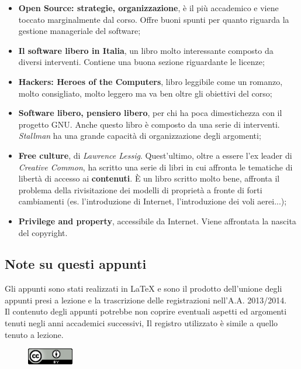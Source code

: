\begin{itemize}

\item \textbf{Open Source: strategie, organizzazione}, è il più accademico e viene toccato marginalmente dal corso. Offre buoni spunti per quanto riguarda la gestione manageriale del software;
\item \textbf{Il software libero in Italia}, un libro molto interessante composto da diversi interventi. Contiene una buona sezione riguardante le licenze;
\item \textbf{Hackers: Heroes of the Computers}, libro leggibile come un romanzo, molto consigliato, molto leggero ma va ben oltre gli obiettivi del corso;
\item \textbf{Software libero, pensiero libero}, per chi ha poca dimestichezza con il progetto GNU. Anche questo libro è composto da una serie di interventi. \textit{Stallman} ha una grande capacità di organizzazione degli argomenti;
\item \textbf{Free culture}, di \textit{Lawrence Lessig}. Quest'ultimo, oltre a essere l'ex leader di \textit{Creative Common}, ha scritto una serie di libri in cui affronta le tematiche di libertà di accesso ai \textbf{contenuti}. È un libro scritto molto bene, affronta il problema della rivisitazione dei modelli di proprietà a fronte di forti cambiamenti (es. l'introduzione di Internet, l'introduzione dei voli aerei...);
\item \textbf{Privilege and property}, accessibile da Internet. Viene affrontata la nascita del copyright.

\end{itemize}

\subsection{Note su questi appunti}
Gli appunti sono stati realizzati in LaTeX e sono il prodotto dell'unione degli appunti presi a lezione e la trascrizione delle registrazioni nell'A.A. 2013/2014. \\

Il contenuto degli appunti potrebbe non coprire eventuali aspetti ed argomenti tenuti negli anni accademici successivi, Il registro utilizzato è simile a quello tenuto a lezione.\\

\begin{figure}
    \includegraphics[width=20mm]{images/cc_by_sa}
\end{figure}

